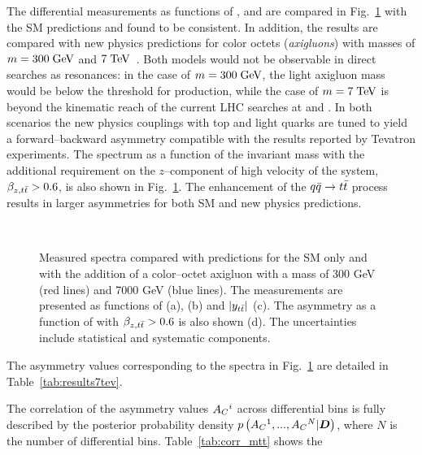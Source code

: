 The differential \ac{} measurements as functions of
\mtt{}, \pttt{} and \ytt{} are compared in Fig.~\ref{fig:unfac_diff}
with the SM predictions and found to be consistent. 
In addition, the results are compared with new physics predictions for
color octets ({\it axigluons}) with masses of $m=300 \; \mathrm{GeV}{}$ and $7
\; \mathrm{TeV}{}$~\cite{AguilarSaavedra:2011ci}. Both models would not
be observable in direct searches as \ttbar{} resonances: in the case
of $m=300\; \mathrm{GeV}$, the light axigluon mass would be below the threshold
for \ttbar{} production, while the case of $m=7 \; \mathrm{TeV}$ is beyond the
kinematic reach of the current LHC searches at \seventev{} and
\eighttev{}. In both scenarios the new physics couplings with top and
light quarks are tuned to yield a forward--backward asymmetry
compatible with the results reported by Tevatron experiments.
The \ac{} spectrum as a function of the \ttbar{} invariant mass \mtt{}
with the additional requirement on the $z$--component of high velocity
of the \ttbar{} system, $\beta_{z,t\bar{t}}{}>0.6$, is also shown in
Fig.~\ref{fig:unfac_diff}. The enhancement of the $q\bar{q}{}\to t\bar{t}{}$
process results in larger asymmetries for both SM and new physics
predictions.
\begin{figure}[!htb]\centering
   \quad
   \\
   \quad
  \caption{Measured \ac{} spectra compared with predictions for the SM
    only and with the addition of a color--octet axigluon with a mass
    of 300 GeV (red lines) and 7000 GeV (blue lines).
    The measurements are presented as functions of \mtt{} (a), \pttt{} (b) and $|y_{t\bar{t}}{}|$ (c). The
    asymmetry as a function of \mtt{} with $\beta_{z,t\bar{t}}{}>0.6$ is also
    shown (d). The uncertainties include statistical and systematic
    components.}
  \label{fig:unfac_diff}
\end{figure}
The asymmetry values corresponding to the spectra in
Fig.~\ref{fig:unfac_diff} are detailed in
Table~\ref{tab:results7tev}.

The correlation of the asymmetry values $A_C{}^i$ across differential
bins is fully described by the posterior probability density
$p\left(A_C{}^1,...,A_C{}^N|\boldsymbol{D}{}\right)$, where $N$ is the
number of differential bins. Table~\ref{tab:corr_mtt} shows the

